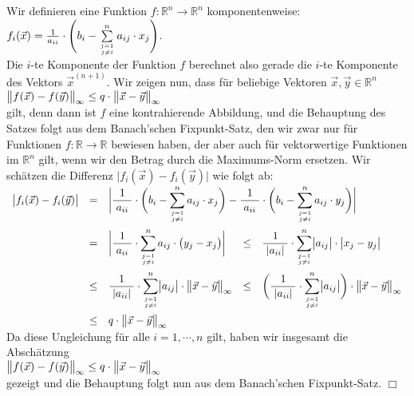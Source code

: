 \proof
Wir definieren eine Funktion $f:\mathbb{R}^n \rightarrow \mathbb{R}^n$
komponentenweise:
\\[0.2cm]
\hspace*{1.3cm}
$f_i(\vec{x}) = \frac{1}{a_{ii}} \cdot  \Biggl( b_i - \sum\limits_{j=1 \atop j \not= i}^n a_{ij} \cdot  x_j \Biggr)$. 
\\[0.2cm]
Die $i$-te Komponente der Funktion $f$ berechnet also gerade die $i$-te
Komponente des Vektors $\vec{x}^{(n+1)}$.  Wir zeigen nun, dass f\"ur beliebige Vektoren
$\vec{x},\vec{y} \in \mathbb{R}^n$
\\[0.2cm]
\hspace*{1.3cm} 
$\big\|f(\vec{x}) - f(\vec{y}) \bigr\|_{\infty} \leq q \cdot  \big\|\vec{x} - \vec{y} \bigr\|_{\infty}$
\\[0.2cm]
gilt, denn dann ist $f$ eine kontrahierende Abbildung, und die Behauptung des
Satzes folgt aus dem Banach'schen Fixpunkt-Satz, den wir zwar nur f\"ur Funktionen 
$f: \mathbb{R} \rightarrow \mathbb{R}$ bewiesen haben, der aber auch f\"ur vektorwertige
Funktionen im $\mathbb{R}^n$ gilt, wenn wir den Betrag durch die Maximums-Norm ersetzen.
Wir sch\"atzen die Differenz $\bigl|f_i(\vec{x}) - f_i(\vec{y})\bigr|$ wie folgt ab:
\\[0.2cm]
\hspace*{0.5cm}
$
\begin{array}[t]{lclcl}
  \bigl|f_i(\vec{x}) - f_i(\vec{y})\bigr| & = & 
  \multicolumn{3}{l}{\biggl|\bruch{1}{a_{ii}} \cdot  \biggl( b_i - \sum\limits_{j=1 \atop j \not= i}^n a_{ij} \cdot  x_j \biggr) -
  \bruch{1}{a_{ii}} \cdot  \biggl( b_i - \sum\limits_{j=1 \atop j \not= i}^n a_{ij} \cdot  y_j \biggr) \biggr|}\\[0.7cm]
& = &
  \biggl|\bruch{1}{a_{ii}} \cdot  \sum\limits_{j=1 \atop j \not= i}^n a_{ij} \cdot  \bigl(y_j  - x_j \bigr)\biggr|
&\leq & \bruch{1}{|a_{ii}|} \cdot  \sum\limits_{j=1 \atop j \not= i}^n \bigl| a_{ij} \bigr| \cdot  \bigl|x_j  - y_j \bigr|\\[0.7cm]
&\leq & \bruch{1}{|a_{ii}|} \cdot  \sum\limits_{j=1 \atop j \not= i}^n \bigl| a_{ij} \bigr| \cdot  \norm{\vec{x} - \vec{y}} 
&\leq & \biggl(\bruch{1}{|a_{ii}|} \cdot  \sum\limits_{j=1 \atop j \not= i}^n \bigl| a_{ij} \bigr| \biggr)\cdot  \norm{\vec{x} - \vec{y}} \\[0.7cm]
&\leq & q \cdot  \norm{\vec{x} - \vec{y}} 
\end{array}
$
\\[0.3cm]
Da diese Ungleichung f\"ur alle $i=1,\cdots,n$ gilt, haben wir insgesamt die Absch\"atzung 
\\[0.2cm]
\hspace*{1.3cm}
$\big\| f(\vec{x}) - f(\vec{y}) \bigr\|_{\infty} \leq q \cdot  \big\|\vec{x} - \vec{y} \bigr\|_{\infty}$
\\[0.2cm]
gezeigt und die Behauptung folgt nun aus dem Banach'schen Fixpunkt-Satz.
\hspace*{\fill} $\Box$
\vspace*{0.3cm}


